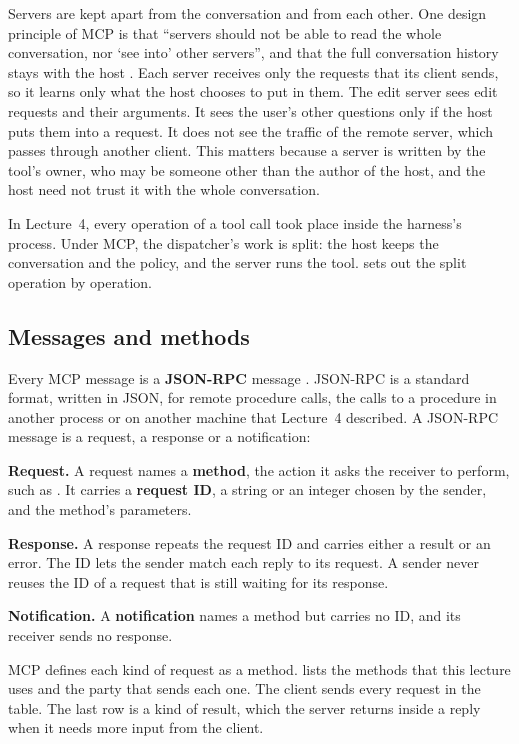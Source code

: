Servers are kept apart from the conversation and from each other. One design principle of MCP is
that ``servers should not be able to read the whole conversation, nor `see into' other servers'',
and that the full conversation history stays with the host \citep{mcp-spec-2026}. Each server
receives only the requests that its client sends, so it learns only what the host chooses to put in
them. The edit server sees edit requests and their arguments. It sees the user's other questions
only if the host puts them into a request. It does not see the traffic of the remote server, which
passes through another client. This matters because a server is written by the
tool's owner, who may be someone other than the author of the host, and the host need not trust it
with the whole conversation.

In Lecture~4, every operation of a tool call took place inside the harness's process. Under MCP, the
dispatcher's work is split: the host keeps the conversation and the policy, and the server runs the
tool.
 sets out the split operation by operation.

\subsection{Messages and methods}
\label{sec:mcp-methods}

Every MCP message is a \textbf{JSON-RPC} message \citep{mcp-spec-2026}. JSON-RPC is a standard
format, written in JSON, for remote procedure calls, the calls to a procedure in another process or
on another machine that Lecture~4 described. A JSON-RPC message is a request, a response or a
notification:
\bi
\item \textbf{Request.} A request names a \textbf{method}, the action it asks the receiver to
perform, such as . It carries a \textbf{request ID}, a string or an integer
chosen by the sender, and the method's parameters.
\item \textbf{Response.} A response repeats the request ID and carries either a result or an error.
The ID lets the sender match each reply to its request. A sender never reuses the ID of a request
that is still waiting for its response.
\item \textbf{Notification.} A \textbf{notification} names a method but carries no ID, and its
receiver sends no response.
\ei

MCP defines each kind of request as a method.  lists the methods that this
lecture uses and the party that sends each one. The client sends every request in the table. The
last row is a kind of result, which the server returns inside a reply when it needs more input from
the client.

